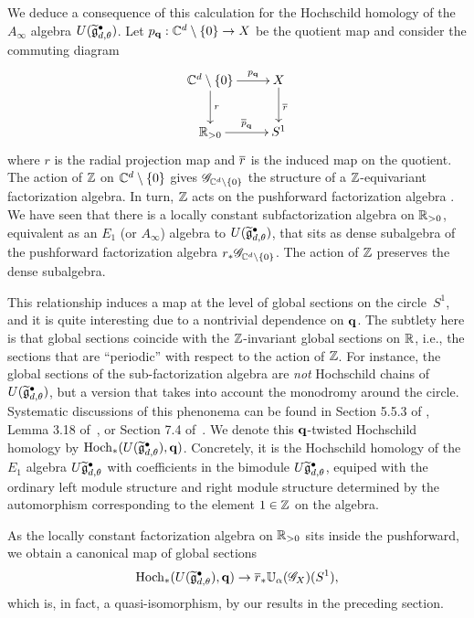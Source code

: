 We deduce a consequence of this calculation for the Hochschild homology of the $A_\infty$ algebra $U(\Tilde{\fg}^\bullet_{d,\theta})$.
Let $p_{\bf q} :  \CC^d \setminus \{0\} \to X$ be the quotient map and consider the commuting diagram
\[
\xymatrix{
\CC^d \setminus \{0\} \ar[r]^-{p_{\bf q}} \ar[d]^-{r} & X \ar[d]^{\Bar{r}} \\
\RR_{>0} \ar[r]^-{\Bar{p}_{\bf q}} & S^1
}
\]
where $r$ is the radial projection map and $\Bar{r}$ is the induced map on the quotient.
The action of $\ZZ$ on $\CC^d \setminus\{0\}$ gives $\sG_{\CC^d \setminus \{0\}}$ the structure of a $\ZZ$-equivariant factorization algebra. 
In turn, $\ZZ$ acts on the pushforward factorization algebra .
We have seen that there is a locally constant subfactorization algebra on $\RR_{>0}$, equivalent as an $E_1$ (or $A_\infty$) algebra to $U(\Tilde{\fg}^\bullet_{d,\theta})$, that sits as dense subalgebra of the pushforward factorization algebra $r_* \sG_{\CC^d \setminus \{0\}}$.
The action of $\ZZ$ preserves the dense subalgebra.

This relationship induces a map at the level of global sections on the circle~$S^1$,
and it is quite interesting due to a nontrivial dependence on ${\bf q}$.
The subtlety here is that global sections coincide with the $\ZZ$-invariant global sections on $\RR$, 
i.e., the sections that are ``periodic'' with respect to the action of $\ZZ$.
For instance, the global sections of the sub-factorization algebra are {\em not} Hochschild chains of $U(\Tilde{\fg}^\bullet_{d,\theta})$, 
but a version that takes into account the monodromy around the circle.
Systematic discussions of this phenonema can be found in Section 5.5.3 of \cite{LurieHA}, Lemma 3.18 of~\cite{AFTopMan}, or Section 7.4 of~\cite{CG1}.
We denote this ${\bf q}$-twisted Hochschild homology by $\Hoch_*(U(\Tilde{\fg}^\bullet_{d,\theta}), {\bf q})$.
Concretely, it is the Hochschild homology of the $E_1$ algebra $U \Tilde{\fg}_{d,\theta}^\bullet$ with coefficients in the bimodule $U \Tilde{\fg}_{d, \theta}^\bullet$, equiped with the ordinary left module structure and right module structure determined by the automorphism corresponding to the element $1 \in \ZZ$ on the algebra.

As the locally constant factorization algebra on $\RR_{>0}$ sits inside the pushforward, 
we obtain a canonical map of global sections
\[
\Hoch_*(U(\Tilde{\fg}^\bullet_{d,\theta}), {\bf q}) \to \Bar{r}_* \UU_\alpha(\sG_X) (S^1) ,
\]
which is, in fact, a quasi-isomorphism, by our results in the preceding section. 

